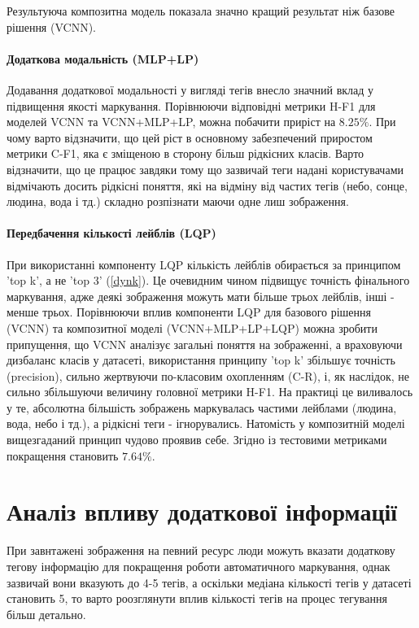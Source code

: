 \documentclass{udstu}
\begin{document}
Результуюча композитна модель показала значно кращий результат ніж базове рішення (VCNN).

\paragraph{\textbf{Додаткова модальність (MLP+LP)}\\}

Додавання додаткової модальності у вигляді тегів внесло значний вклад
у підвищення якості маркування.
Порівнюючи відповідні метрики H-F1 для моделей VCNN та VCNN+MLP+LP, можна
побачити приріст на $8.25\%$. При чому варто відзначити, що цей ріст в основному
забезпечений приростом метрики C-F1, яка є зміщеною в сторону більш рідкісних класів.
Варто відзначити, що це працює завдяки тому що зазвичай теги надані користувачами відмічають
досить рідкісні поняття, які на відміну від частих тегів (небо, сонце, людина, вода і тд.) складно
розпізнати маючи одне лиш зображення.

\paragraph{\textbf{Передбачення кількості лейблів (LQP)}\\}

При використанні компоненту LQP кількість лейблів обирається за принципом 'top k', а не 'top 3' (\ref{dynk}).
Це очевидним чином підвищує точність фінального  маркування, адже деякі зображення можуть мати більше трьох лейблів,
інші - менше трьох. Порівнюючи вплив компоненти LQP для базового рішення (VCNN) та композитної моделі (VCNN+MLP+LP+LQP)
можна зробити припущення, що VCNN аналізує загальні поняття на зображенні, а враховуючи дизбаланс класів у датасеті,
використання принципу 'top k' збільшує точність (precision), сильно жертвуючи по-класовим охопленням (C-R), і,
як наслідок, не сильно збільшуючи величину головної метрики H-F1. На практиці це виливалось у те, абсолютна більшість
зображень маркувалась частими лейблами (людина, вода, небо і тд.), а рідкісні теги - ігнорувались.
Натомість у композитній моделі вищезгаданий принцип чудово проявив себе.
Згідно із тестовими метриками покращення становить $7.64\%$.


\section{Аналіз впливу додаткової інформації}

При завнтажені зображення на певний ресурс люди можуть вказати додаткову тегову інформацію
для покращення роботи автоматичного маркування, однак зазвичай вони вказують до 4-5 тегів,
а оскільки медіана кількості тегів у датасеті становить 5, то варто роозглянути вплив кількості
тегів на процес тегування більш детально.
\end{document}
